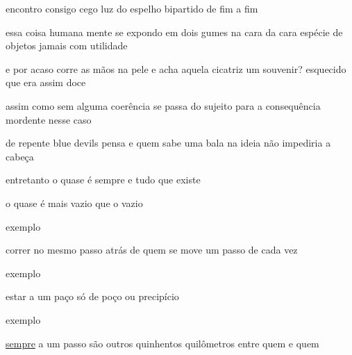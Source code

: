 \begin{poem}
\begin{stanza}
encontro consigo\verseline
cego luz do\verseline
espelho bipartido\verseline
de fim a fim
\end{stanza}
\begin{stanza}
essa coisa humana\verseline
mente se expondo\verseline
em dois gumes na cara\verseline
da cara \quad espécie\verseline
de objetos jamais\verseline
com utilidade
\end{stanza}
\begin{stanza}
e por acaso corre\verseline
as mãos na pele\verseline
e acha\verseline
aquela cicatriz\verseline
um souvenir?\verseline
esquecido\verseline
que era assim doce
\end{stanza}
\begin{stanza}
assim como\verseline
sem alguma coerência\verseline
se passa do sujeito\verseline
para a consequência\verseline
mordente nesse caso
\end{stanza}
\begin{stanza}
de repente blue devils\verseline
pensa \quad e quem sabe\verseline
uma bala na ideia\verseline
não impediria\verseline
a cabeça
\end{stanza}
\begin{stanza}
entretanto\verseline
o quase é sempre\verseline
e tudo que existe
\end{stanza}
\begin{stanza}
o quase é mais\verseline
vazio que o vazio
\end{stanza}
\begin{stanza}
exemplo
\end{stanza}
\begin{stanza}
correr no mesmo\verseline
passo\verseline
atrás de quem\verseline
se move um passo\verseline
de cada vez
\end{stanza}
\begin{stanza}
exemplo
\end{stanza}
\begin{stanza}
estar a um paço\verseline
só de poço\verseline
ou precipício
\end{stanza}
\begin{stanza}
exemplo
\end{stanza}
\begin{stanza}
\underline{sempre} a um passo\verseline
são outros quinhentos\verseline
quilômetros entre\verseline
quem e quem
\end{stanza}
\end{poem}